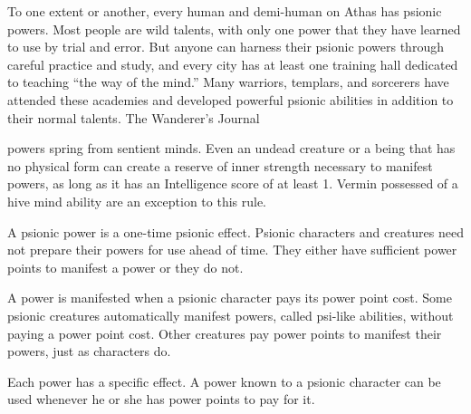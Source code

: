 {To one extent or another, every human and demi-human on Athas has psionic powers. Most people are wild talents, with only one power that they have learned to use by trial and error. But anyone can harness their psionic powers through careful practice and study, and every city has at least one training hall dedicated to teaching ``the way of the mind.'' Many warriors, templars, and sorcerers have attended these academies and developed powerful psionic abilities in addition to their normal talents. }
{The Wanderer's Journal}

 powers spring from sentient minds. Even an undead creature or a being that has no physical form can create a reserve of inner strength necessary to manifest powers, as long as it has an Intelligence score of at least 1. Vermin possessed of a hive mind ability are an exception to this rule.

A psionic power is a one-time psionic effect. Psionic characters and creatures need not prepare their powers for use ahead of time. They either have sufficient power points to manifest a power or they do not.

A power is manifested when a psionic character pays its power point cost. Some psionic creatures automatically manifest powers, called psi-like abilities, without paying a power point cost. Other creatures pay power points to manifest their powers, just as characters do.

Each power has a specific effect. A power known to a psionic character can be used whenever he or she has power points to pay for it.



